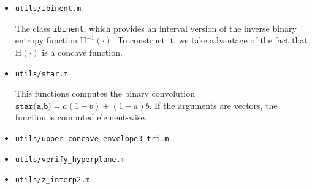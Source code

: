 \documentclass[a4paper,12pt]{scrartcl}
\newcommand{\binEnt}[1]{\ensuremath{\mathrm{H}(#1)}}
\newcommand{\binEntInv}[1]{\ensuremath{\mathrm{H}^{-1}(#1)}}
\begin{document}
\begin{itemize}
  
\item \texttt{utils/ibinent.m}

  The class \texttt{ibinent}, which provides an interval version of the inverse binary entropy function $\binEntInv{\cdot}$. To construct it, we take advantage of the fact that $\binEnt{\cdot}$ is a concave function.
  
  

  
\item \texttt{utils/star.m}

  This functions computes the binary convolution $\texttt{star(a,b)} = a (1-b) + (1-a) b$. If the arguments are vectors, the function is computed element-wise.
  
  
  
\item \texttt{utils/upper\_concave\_envelope3\_tri.m}

  
\item \texttt{utils/verify\_hyperplane.m}

  
\item \texttt{utils/z\_interp2.m}

  
\end{itemize}
 


\printbibliography[heading=bibintoc]
\end{document}
